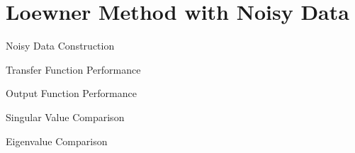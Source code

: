 \section{Loewner Method with Noisy Data}

\begin{frame}{Noisy Data Construction}

\end{frame}
\begin{frame}{Transfer Function Performance}

\end{frame}

\begin{frame}{Output Function Performance}

\end{frame}

\begin{frame}{Singular Value Comparison}

\end{frame}

\begin{frame}{Eigenvalue Comparison}

\end{frame}